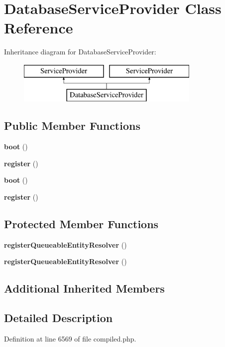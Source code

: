 \section{Database\+Service\+Provider Class Reference}
\label{class_illuminate_1_1_database_1_1_database_service_provider}
Inheritance diagram for Database\+Service\+Provider\+:\begin{figure}[H]
\begin{center}
\leavevmode
\includegraphics[height=2.000000cm]{class_illuminate_1_1_database_1_1_database_service_provider}
\end{center}
\end{figure}
\subsection*{Public Member Functions}
\begin{DoxyCompactItemize}
\item 
{\bf boot} ()
\item 
{\bf register} ()
\item 
{\bf boot} ()
\item 
{\bf register} ()
\end{DoxyCompactItemize}
\subsection*{Protected Member Functions}
\begin{DoxyCompactItemize}
\item 
{\bf register\+Queueable\+Entity\+Resolver} ()
\item 
{\bf register\+Queueable\+Entity\+Resolver} ()
\end{DoxyCompactItemize}
\subsection*{Additional Inherited Members}


\subsection{Detailed Description}


Definition at line 6569 of file compiled.\+php.



